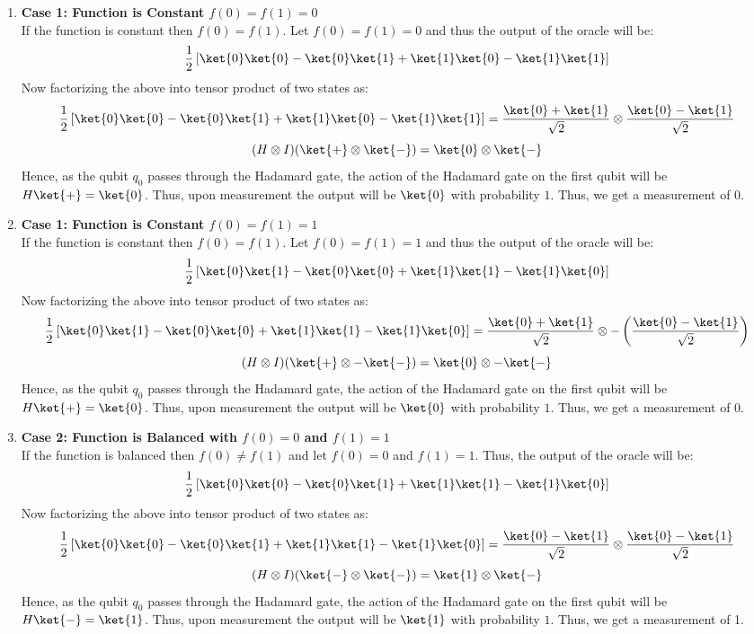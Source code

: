 \documentclass[12pt, oneside]{book}
\theoremstyle{definition}
\theoremstyle{definition}
\theoremstyle{remark}
\begin{document}
\begin{enumerate}
    \item \textbf{Case 1: Function is Constant $f(0)=f(1)=0$}\\
    If the function is constant then $f(0)=f(1)$. Let $f(0)=f(1)=0$ and thus the output of the oracle will be:
    \[
        \frac{1}{2}\left[\ket{0}\ket{0}-\ket{0}\ket{1}+\ket{1}\ket{0}-\ket{1}\ket{1}\right]
    \]
    Now factorizing the above into tensor product of two states as:
    \[
        \frac{1}{2}\left[\ket{0}\ket{0}-\ket{0}\ket{1}+\ket{1}\ket{0}-\ket{1}\ket{1}\right]=\frac{\ket{0}+\ket{1}}{\sqrt{2}}\otimes \frac{\ket{0}-\ket{1}}{\sqrt{2}}
    \]
    \[
        (H\otimes I)(\ket{+} \otimes \ket{-})=\ket{0}\otimes \ket{-}
    \]
    Hence, as the qubit $q_0$ passes through the Hadamard gate, the action of the Hadamard gate on the first qubit will be $H\ket{+}=\ket{0}$. 
    Thus, upon measurement the output will be $\ket{0}$ with probability $1$. Thus, we get a measurement of 0.
    
    \item \textbf{Case 1: Function is Constant $f(0)=f(1)=1$}\\
    If the function is constant then $f(0)=f(1)$. Let $f(0)=f(1)=1$ and thus the output of the oracle will be:
    \[
        \frac{1}{2}\left[\ket{0}\ket{1}-\ket{0}\ket{0}+\ket{1}\ket{1}-\ket{1}\ket{0}\right]
    \]
    Now factorizing the above into tensor product of two states as:
    \[
        \frac{1}{2}\left[\ket{0}\ket{1}-\ket{0}\ket{0}+\ket{1}\ket{1}-\ket{1}\ket{0}\right]=\frac{\ket{0}+\ket{1}}{\sqrt{2}}\otimes -\left(\frac{\ket{0}-\ket{1}}{\sqrt{2}}\right)
    \]
    \[
        (H\otimes I)(\ket{+} \otimes -\ket{-})=\ket{0}\otimes -\ket{-}
    \]
    Hence, as the qubit $q_0$ passes through the Hadamard gate, the action of the Hadamard gate on the first qubit will be $H\ket{+}=\ket{0}$.
    Thus, upon measurement the output will be $\ket{0}$ with probability $1$. Thus, we get a measurement of 0.
    
    \item \textbf{Case 2: Function is Balanced with $f(0)=0$ and $f(1)=1$}\\
    If the function is balanced then $f(0)\neq f(1)$ and let $f(0)=0$ and $f(1)=1$. Thus, the output of the oracle will be:
    \[
        \frac{1}{2}\left[\ket{0}\ket{0}-\ket{0}\ket{1}+\ket{1}\ket{1}-\ket{1}\ket{0}\right]
    \]
    Now factorizing the above into tensor product of two states as:
    \[
        \frac{1}{2}\left[\ket{0}\ket{0}-\ket{0}\ket{1}+\ket{1}\ket{1}-\ket{1}\ket{0}\right]=\frac{\ket{0}-\ket{1}}{\sqrt{2}}\otimes \frac{\ket{0}-\ket{1}}{\sqrt{2}}
    \]
    \[
        (H\otimes I)(\ket{-} \otimes \ket{-})=\ket{1}\otimes \ket{-}
    \]
    Hence, as the qubit $q_0$ passes through the Hadamard gate, the action of the Hadamard gate on the first qubit will be $H\ket{-}=\ket{1}$.
    Thus, upon measurement the output will be $\ket{1}$ with probability $1$. Thus, we get a measurement of 1.


\end{enumerate}
\end{document}
